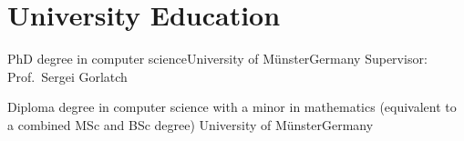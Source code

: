 \section{University Education}
        {PhD degree in computer science}{University of Münster}{Germany}{}
        {Supervisor: Prof.\ Sergei Gorlatch}

        {Diploma degree in computer science with a minor in mathematics}
        {\newline(equivalent to a combined MSc and BSc degree) University of Münster}{Germany}{}{}
